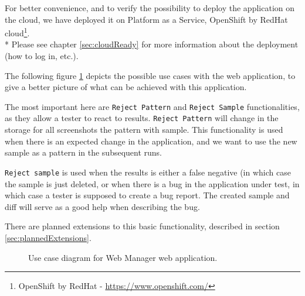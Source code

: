 \documentclass[11pt,oneside,final]{fithesis2}
\begin{document}
    For better convenience, and to verify the possibility to deploy the application on the cloud, we have
    deployed it on Platform as a Service, OpenShift by RedHat cloud\footnote{OpenShift by RedHat - \url{https://www.openshift.com/}}.
    \\* Please see chapter \ref{sec:cloudReady} for more information about the deployment (how to log in, etc.).
    
    The following figure \ref{fig:useCaseDiagramWebManApp} depicts the possible use cases with the web application, to give a better picture of what can be achieved
    with this application.
    
    The most important here are \texttt{Reject Pattern} and \texttt{Reject Sample} functionalities, as they allow a tester to react
    to results. \texttt{Reject Pattern} will change in the storage for all screenshots the pattern with sample. This functionality is
    used when there is an expected change in the application, and we want to use the new sample as a pattern in the subsequent runs.
    
    \texttt{Reject sample} is used when the results is either a false negative (in which case the sample is just deleted, or when
    there is a bug in the application under test, in which case a tester is supposed to create a bug report. The created sample and diff
    will serve as a good help when describing the bug. 
    
    There are planned extensions to this basic functionality, described in section \ref{sec:plannedExtensions}.
    
    \begin{figure}[!htb]
      \begin{center}
      \leavevmode
      \centerline{}
      \end{center}
      \caption{Use case diagram for Web Manager web application.}
      \label{fig:useCaseDiagramWebManApp}
    \end{figure}
        
\end{document}
